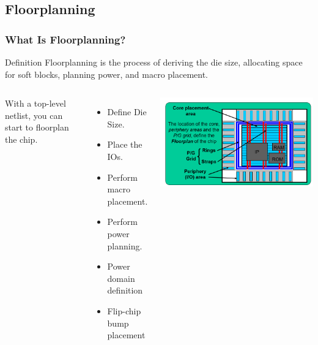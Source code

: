 \documentclass[compress]{beamer}
\begin{document}
\subsection[Floor]{Floorplanning}
\begin{frame}
	\frametitle{What Is Floorplanning?}
	\begin{block}{Definition}
		Floorplanning is the process of deriving the die size, allocating space for soft blocks, planning power, and macro placement.
	\end{block}
	\begin{columns}	
		With a top-level netlist, you can start to floorplan the chip.
		\begin{itemize}
			\item Define Die Size.
			\item Place the IOs.
			\item Perform macro placement.
			\item Perform power planning.
			\item Power domain definition
			\item Flip-chip bump placement
		\end{itemize}
		\begin{center}
			\includegraphics[width= \textwidth]{Floorplanning1}
		\end{center}
	\end{columns}
\end{frame}
\end{document}
